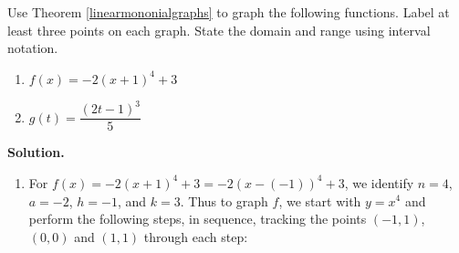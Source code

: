 \documentclass{ximera}
\begin{document}

\begin{example} \label{linearmonomialex}  Use Theorem \ref{linearmononialgraphs} to graph the following functions.  Label at least three points on each graph. State the domain and range using interval notation.
	

\begin{enumerate}


\item  $f(x) = -2(x+1)^4+3$ 

\item  $g(t) = \dfrac{(2t-1)^3}{5}$

\end{enumerate}



{\bf Solution.} 

\begin{enumerate}

\item For  $f(x) = -2(x+1)^4+3 = -2 (x-(-1))^4+3$, we identify $n = 4$, $a = -2$, $h = -1$, and $k = 3$.  Thus to graph $f$, we start with $y = x^4$ and perform the following steps, in sequence, tracking the points $(-1,1)$, $(0,0)$ and $(1,1)$ through each step:

\begin{center}
\end{center}








\end{enumerate}
\end{example}
\end{document}

